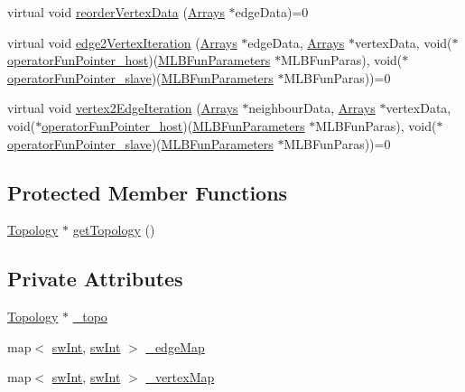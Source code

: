 \begin{DoxyCompactItemize}
\item 
virtual void \hyperlink{classIterator_abe5bcf1a342b1ed4e3a5efe7f630e6d9}{reorderVertexData} (\hyperlink{structArrays}{Arrays} $\ast$edgeData)=0
\item 
virtual void \hyperlink{classIterator_a9606486fd118ee0131bc85a4c825feb8}{edge2VertexIteration} (\hyperlink{structArrays}{Arrays} $\ast$edgeData, \hyperlink{structArrays}{Arrays} $\ast$vertexData, void($\ast$\hyperlink{test_8cpp_aecc50c51899b7a8153dc83e95c3e6976}{operatorFunPointer\_\-host})(\hyperlink{structMLBFunParameters}{MLBFunParameters} $\ast$MLBFunParas), void($\ast$\hyperlink{test_8cpp_a434737e1969edf175d1bea960d600584}{operatorFunPointer\_\-slave})(\hyperlink{structMLBFunParameters}{MLBFunParameters} $\ast$MLBFunParas))=0
\item 
virtual void \hyperlink{classIterator_af3f4a8ad925b4a2029d9b2db74787094}{vertex2EdgeIteration} (\hyperlink{structArrays}{Arrays} $\ast$neighbourData, \hyperlink{structArrays}{Arrays} $\ast$vertexData, void($\ast$\hyperlink{test_8cpp_aecc50c51899b7a8153dc83e95c3e6976}{operatorFunPointer\_\-host})(\hyperlink{structMLBFunParameters}{MLBFunParameters} $\ast$MLBFunParas), void($\ast$\hyperlink{test_8cpp_a434737e1969edf175d1bea960d600584}{operatorFunPointer\_\-slave})(\hyperlink{structMLBFunParameters}{MLBFunParameters} $\ast$MLBFunParas))=0
\end{DoxyCompactItemize}
\subsection*{Protected Member Functions}
\begin{DoxyCompactItemize}
\item 
\hyperlink{classTopology}{Topology} $\ast$ \hyperlink{classIterator_a1fd2f17fcb324b5f3c31c42f65185ba9}{getTopology} ()
\end{DoxyCompactItemize}
\subsection*{Private Attributes}
\begin{DoxyCompactItemize}
\item 
\hyperlink{classTopology}{Topology} $\ast$ \hyperlink{classIterator_a8c90147f6541ebb64ae6fb68d622a2fb}{\_\-topo}
\item 
map$<$ \hyperlink{swMacro_8h_a113cf5f6b5377cdf3fac6aa4e443e9aa}{swInt}, \hyperlink{swMacro_8h_a113cf5f6b5377cdf3fac6aa4e443e9aa}{swInt} $>$ \hyperlink{classIterator_aedde11e435ff2559186706fdbbd3fe5a}{\_\-edgeMap}
\item 
map$<$ \hyperlink{swMacro_8h_a113cf5f6b5377cdf3fac6aa4e443e9aa}{swInt}, \hyperlink{swMacro_8h_a113cf5f6b5377cdf3fac6aa4e443e9aa}{swInt} $>$ \hyperlink{classIterator_a3c329666d26e1f9d74a61b46adcadd74}{\_\-vertexMap}
\end{DoxyCompactItemize}


